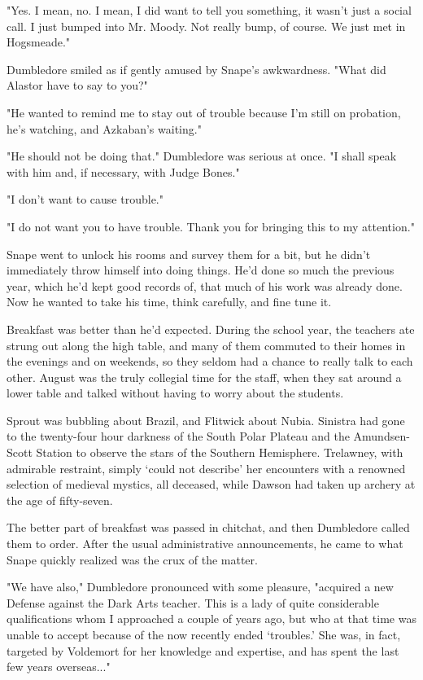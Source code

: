 "Yes. I mean, no. I mean, I did want to tell you something, it wasn't just a social call. I just bumped into Mr. Moody. Not really bump, of course. We just met in Hogsmeade."

Dumbledore smiled as if gently amused by Snape's awkwardness. "What did Alastor have to say to you?"

"He wanted to remind me to stay out of trouble because I'm still on probation, he's watching, and Azkaban's waiting."

"He should not be doing that." Dumbledore was serious at once. "I shall speak with him and, if necessary, with Judge Bones."

"I don't want to cause trouble."

"I do not want you to have trouble. Thank you for bringing this to my attention."

Snape went to unlock his rooms and survey them for a bit, but he didn't immediately throw himself into doing things. He'd done so much the previous year, which he'd kept good records of, that much of his work was already done. Now he wanted to take his time, think carefully, and fine tune it.

Breakfast was better than he'd expected. During the school year, the teachers ate strung out along the high table, and many of them commuted to their homes in the evenings and on weekends, so they seldom had a chance to really talk to each other. August was the truly collegial time for the staff, when they sat around a lower table and talked without having to worry about the students.

Sprout was bubbling about Brazil, and Flitwick about Nubia. Sinistra had gone to the twenty-four hour darkness of the South Polar Plateau and the Amundsen-Scott Station to observe the stars of the Southern Hemisphere. Trelawney, with admirable restraint, simply `could not describe' her encounters with a renowned selection of medieval mystics, all deceased, while Dawson had taken up archery at the age of fifty-seven.

The better part of breakfast was passed in chitchat, and then Dumbledore called them to order. After the usual administrative announcements, he came to what Snape quickly realized was the crux of the matter.

"We have also," Dumbledore pronounced with some pleasure, "acquired a new Defense against the Dark Arts teacher. This is a lady of quite considerable qualifications whom I approached a couple of years ago, but who at that time was unable to accept because of the now recently ended `troubles.' She was, in fact, targeted by Voldemort for her knowledge and expertise, and has spent the last few years overseas..."

